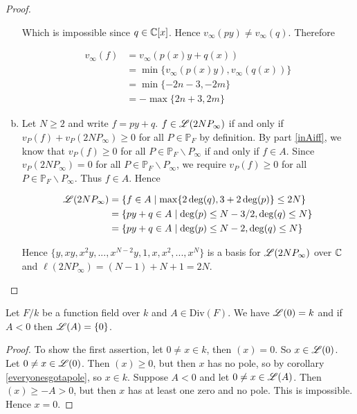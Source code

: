 \begin{proof}
\begin{enumerate}[(a)]
	Which is impossible since $q \in \mathbb{C} [x]$. 
	Hence $v_\infty(py) \neq v_\infty (q) $. Therefore 


	\begin{align*}
		v_\infty (f) &= v_\infty( p(x)y + q(x) ) \\
		&= \min \lbrace  v_\infty( p(x)y),  v_\infty( q(x) ) \rbrace \\
		&= \min \lbrace -2n - 3, -2m \rbrace  \\
		&= - \max \lbrace 2n + 3, 2m \rbrace 
	\end{align*}

	\item Let $N\geq 2$ and write $f = py + q$. $f \in \mathscr{L} (2N P_\infty ) $ 
	if and only if $v_P(f) + v_P(2N P_\infty) \geq 0 $ 
	for all $P\in \mathbb{P}_F$ by definition. 
	By part \eqref{inAiff}, we know that $v_P(f) \geq 0 $ 
	for all $P\in \mathbb{P}_F \backslash P_\infty$ if and 
	only if $f \in A$. Since $v_P(2NP_\infty) = 0 $ for 
	all $P \in \mathbb{P}_F \backslash P_\infty$, we 
	require $v_P(f) \geq 0 $ for 
	all $P \in \mathbb{P}_F \backslash P_\infty$. 
	Thus $f \in A$. Hence

	\begin{align*} 
		\mathscr{L} (2N P_\infty ) &= \lbrace f \in A \mid \max \lbrace 2\deg(q), 3 + 2\deg(p) \rbrace \leq 2N \rbrace \\
		 &= \lbrace  py + q \in A \mid \deg(p) \leq N-3/2, \deg(q) \leq N \rbrace \\
		 &= \lbrace  py + q \in A \mid \deg(p) \leq N - 2, \deg(q) \leq N \rbrace 
	\end{align*}

	\noindent Hence $\lbrace y, xy, x^2y,...,x^{N-2}y,1,x,x^2,...,x^N \rbrace $ 
	is a basis for $\mathscr{L} (2N P_\infty )$ 
	over $\mathbb{C}$ and $\ell( 2N P_\infty )= (N - 1) + N + 1 = 2N$. 

\end{enumerate}
\end{proof}

\begin{example} \label{RRis0}
	Let $F/k$ be a function field over $k$ and $A \in \text{Div}(F)$.
	We have $\mathscr{L}(0) = k$ and if $A < 0$ then $\mathscr{L}(A) = \lbrace 0 \rbrace$.
\end{example}


\begin{proof}
	To show the first assertion, let $0 \neq x \in k$, then $(x)=0$. So 
	$x \in \mathscr{L}(0)$. Let $0 \neq x \in \mathscr{L}(0)$.
	Then $(x) \geq 0$, but then $x$ has no pole, so by corollary \ref{everyonesgotapole},
	so $x \in k$. Suppose $A < 0$ and let $ 0 \neq x \in \mathscr{L}(A)$. Then $(x) \geq - A > 0$, 
	but then $x $ has at least one zero and no pole. This is impossible. Hence $x = 0$.
\end{proof}


